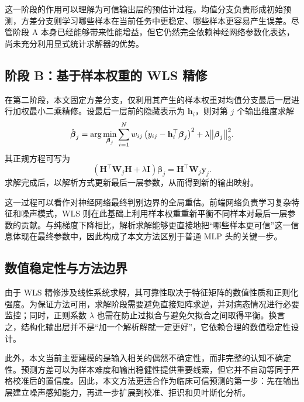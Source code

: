 这一阶段的作用可以理解为可信输出层的预估计过程。均值分支负责形成初始预测，方差分支则学习哪些样本在当前任务中更稳定、哪些样本更容易产生误差。尽管阶段 A 本身已经能够带来性能增益，但它仍然完全依赖神经网络参数化表达，尚未充分利用显式统计求解器的优势。

\subsection{阶段 B：基于样本权重的 WLS 精修}
在第二阶段，本文固定方差分支，仅利用其产生的样本权重对均值分支最后一层进行加权最小二乘精修。设最后一层前的隐藏表示为 $\mathbf{h}_i$，则对第 $j$ 个输出维度求解
\[
\hat{\boldsymbol{\beta}}_j = \arg\min_{\boldsymbol{\beta}_j} \sum_{i=1}^{N} w_{ij}\left(y_{ij} - \mathbf{h}_i^{\top}\boldsymbol{\beta}_j\right)^2 + \lambda \norm{\boldsymbol{\beta}_j}_2^2.
\]
其正规方程可写为
\[
(\mathbf{H}^{\top}\mathbf{W}_j\mathbf{H} + \lambda \mathbf{I})\boldsymbol{\beta}_j = \mathbf{H}^{\top}\mathbf{W}_j\mathbf{y}_j.
\]
求解完成后，以解析方式更新最后一层参数，从而得到新的输出映射。

这一过程可以看作对神经网络最终判别边界的全局重估。前端网络负责学习复杂特征和噪声模式，WLS 则在此基础上利用样本权重重新平衡不同样本对最后一层参数的贡献。与纯梯度下降相比，解析求解能够更直接地把“哪些样本更可信”这一信息体现在最终参数中，因此构成了本文方法区别于普通 MLP 头的关键一步。

\subsection{数值稳定性与方法边界}
由于 WLS 精修涉及线性系统求解，其可靠性取决于特征矩阵的数值性质和正则化强度。为保证方法可用，求解阶段需要避免直接矩阵求逆，并对病态情况进行必要监控；同时，正则系数 $\lambda$ 也需在防止过拟合与避免欠拟合之间取得平衡。换言之，结构化输出层并不是“加一个解析解就一定更好”，它依赖合理的数值稳定性设计。

此外，本文当前主要建模的是输入相关的偶然不确定性，而非完整的认知不确定性。预测方差可以为样本难度和输出稳健性提供重要线索，但它并不自动等同于严格校准后的置信度。因此，本文方法更适合作为临床可信预测的第一步：先在输出层建立噪声感知能力，再进一步扩展到校准、拒识和贝叶斯化分析。
